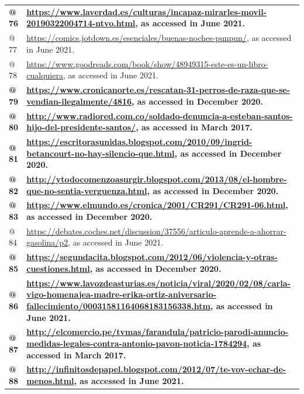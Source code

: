 \documentclass[10pt]{article}
\begin{document}
\begin{flushleft}
\begin{supertabular}{m{0.7955598in}m{5.35876in}}
{\bfseries \textmd{@ 76 }} &
{\bfseries \url{https://www.laverdad.es/culturas/incapaz-mirarles-movil-20190322004714-ntvo.html}\textmd{, as accessed in June 2021.}}\\
@ 77  &
\url{https://comics.jotdown.es/esenciales/buenas-noches-punpun/}, as accessed in June 2021.\\
@ 78  &
\url{https://www.goodreads.com/book/show/48949315-este-es-un-libro-cualquiera}, as accessed in June 2021.\\
{\bfseries \textmd{@ 79 }} &
{\bfseries \url{https://www.cronicanorte.es/rescatan-31-perros-de-raza-que-se-vendian-ilegalmente/4816}\textmd{, as accessed in December 2020.}}\\
{\bfseries \textmd{@ 80 }} &
{\bfseries \url{http://www.radiored.com.co/soldado-denuncia-a-esteban-santos-hijo-del-presidente-santos/}\textmd{, as accessed in March 2017.}}\\
{\bfseries \textmd{@ 81 }} &
{\bfseries \url{https://escritorasunidas.blogspot.com/2010/09/ingrid-betancourt-no-hay-silencio-que.html}\textmd{, as accessed in December 2020.}}\\
{\bfseries \textmd{@ 82 }} &
{\bfseries \url{http://ytodocomenzoasurgir.blogspot.com/2013/08/el-hombre-que-no-sentia-verguenza.html}\textmd{, as accessed in December 2020.}}\\
{\bfseries \textmd{@ 83 }} &
{\bfseries \url{https://www.elmundo.es/cronica/2001/CR291/CR291-06.html}\textmd{, as accessed in December 2020.}}\\
@ 84  &
\url{https://debates.coches.net/discussion/37556/articulo-aprende-a-ahorrar-gasolina/p2}, as accessed in June 2021.\\
{\bfseries \textmd{@ 85 }} &
{\bfseries \url{https://segundacita.blogspot.com/2012/06/violencia-y-otras-cuestiones.html}\textmd{, as accessed in December 2020.}}\\
{\bfseries \textmd{@ 86 }} &
{\bfseries \url{https://www.lavozdeasturias.es/noticia/viral/2020/02/08/carla-vigo-homenajea-madre-erika-ortiz-aniversario-fallecimiento/00031581164068183156338.htm}\textmd{, as accessed in June 2021.}}\\
{\bfseries \textmd{@ 87 }} &
{\bfseries \url{http://elcomercio.pe/tvmas/farandula/patricio-parodi-anuncio-medidas-legales-contra-antonio-pavon-noticia-1784294}\textmd{, as accessed in March 2017.}}\\
{\bfseries \textmd{@ 88 }} &
{\bfseries \url{http://infinitosdepapel.blogspot.com/2012/07/te-voy-echar-de-menos.html}\textmd{, as accessed in June 2021.}}\\

\end{supertabular}
\end{flushleft}
\end{document}
